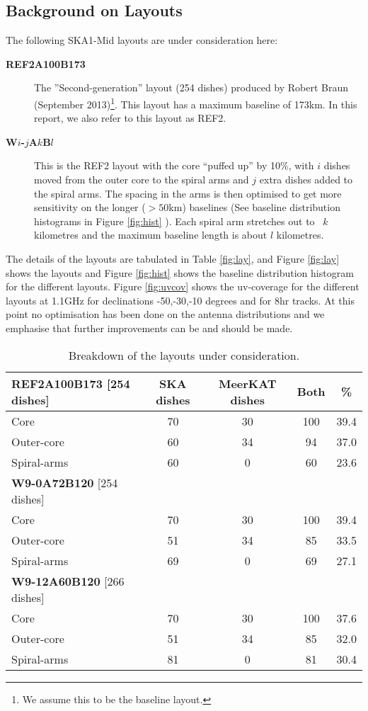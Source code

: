 \documentclass[sfheadings,a4paper,times,9pt,floats,floatfix]{article}
\begin{document}
\subsection{Background on Layouts}\label{sec:layouts}
The following SKA1-Mid layouts are under consideration here:
\begin{description}
\item[{\bf REF2A100B173}] The ”Second-generation” layout (254 dishes) produced by Robert Braun (September 2013)\footnote{We assume
this to be the baseline layout.}. This layout has a maximum baseline of 173km. In this report, we also refer to this layout as
REF2.
\item[{\bf W$i$-$j$A$k$B$l$}] This is the REF2 layout with the core ``puffed up'' by 10\%,  with $ i$ dishes moved  from the
outer core to the spiral arms and $j$ extra dishes added to the spiral arms. The spacing in the arms is then optimised  to get
more sensitivity on the longer ($>50$km) baselines (See baseline distribution histograms in Figure \ref{fig:hist} ). Each spiral
arm stretches out to ~$k$ kilometres and the maximum baseline length is about $l$ kilometres.
\end{description}
The details of the layouts are tabulated in Table \ref{fig:lay}, and Figure \ref{fig:lay} shows the layouts and Figure
\ref{fig:hist} shows the baseline distribution histogram for the different layouts. Figure \ref{fig:uvcov} shows the uv-coverage
for the different layouts at 1.1GHz for declinations -50,-30,-10 
degrees and for 8hr tracks. At this point no optimisation has been
done on the antenna distributions and we emphasise that further improvements can be and should be made.
\begin{table}[H]
\centering
 \tiny{
 \begin{tabular}{l|cccc}\hline
 {\bf REF2A100B173} [254 dishes] & SKA dishes&  MeerKAT dishes & Both & \% \\\hline\hline
  Core & 70 & 30 & 100 & 39.4 \\
 Outer-core & 60 & 34 & 94 & 37.0 \\
 Spiral-arms & 60 & 0 & 60 & 23.6 \\\hline\hline
  {\bf W9-0A72B120} [254 dishes] &  & &  & \\\hline\hline
  Core & 70 & 30 & 100 & 39.4 \\
 Outer-core & 51 & 34 & 85 & 33.5 \\
 Spiral-arms & 69 & 0 & 69 & 27.1 \\\hline\hline
  {\bf W9-12A60B120} [266 dishes] &  & &  & \\\hline\hline
  Core & 70 & 30 & 100 & 37.6 \\
 Outer-core & 51 & 34 & 85 & 32.0 \\
 Spiral-arms & 81 & 0 & 81 & 30.4 \\\hline\hline
 \end{tabular}}
 \caption{Breakdown of the layouts under consideration.}\label{tab:lay}
\end{table}
\end{document}
